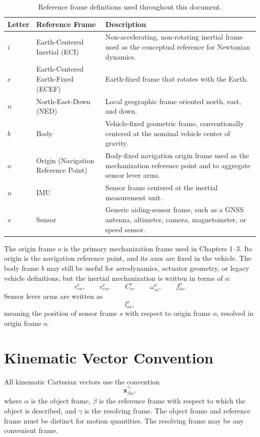 \documentclass[11pt,oneside]{book}
\begin{document}
\begin{table}[htbp]
\centering
\caption{Reference frame definitions used throughout this document.}
\label{tab:reference_frames}
\renewcommand{\arraystretch}{1.2}
\begin{tabular}{p{}p{}p{}}
\toprule
\textbf{Letter} & \textbf{Reference Frame} & \textbf{Description}\\
\midrule
$i$ & Earth-Centered Inertial (ECI) & Non-accelerating, non-rotating inertial frame used as the conceptual reference for Newtonian dynamics.\\
$e$ & Earth-Centered Earth-Fixed (ECEF) & Earth-fixed frame that rotates with the Earth.\\
$n$ & North-East-Down (NED) & Local geographic frame oriented north, east, and down.\\
$b$ & Body & Vehicle-fixed geometric frame, conventionally centered at the nominal vehicle center of gravity.\\
$o$ & Origin (Navigation Reference Point) & Body-fixed navigation origin frame used as the mechanization reference point and to aggregate sensor lever arms.\\
$u$ & IMU & Sensor frame centered at the inertial measurement unit.\\
$s$ & Sensor & Generic aiding-sensor frame, such as a GNSS antenna, altimeter, camera, magnetometer, or speed sensor.\\
\bottomrule
\end{tabular}
\end{table}

The origin frame $o$ is the primary mechanization frame used in Chapters 1--3. Its origin is the navigation reference point, and its axes are fixed in the vehicle. The body frame $b$ may still be useful for aerodynamics, actuator geometry, or legacy vehicle definitions, but the inertial mechanization is written in terms of $o$:
\[
r_{eo}^{e}, \qquad
v_{eo}^{e}, \qquad
C_o^e, \qquad
\omega_{io}^{o}, \qquad
f_{io}^{o}.
\]
Sensor lever arms are written as
\[
l_{os}^{o},
\]
meaning the position of sensor frame $s$ with respect to origin frame $o$, resolved in origin frame $o$.

\section{Kinematic Vector Convention}

All kinematic Cartesian vectors use the convention
\begin{equation}
\mathbf{x}_{\beta\alpha}^{\gamma},
\end{equation}
where $\alpha$ is the object frame, $\beta$ is the reference frame with respect to which the object is described, and $\gamma$ is the resolving frame. The object frame and reference frame must be distinct for motion quantities. The resolving frame may be any convenient frame.
\end{document}
